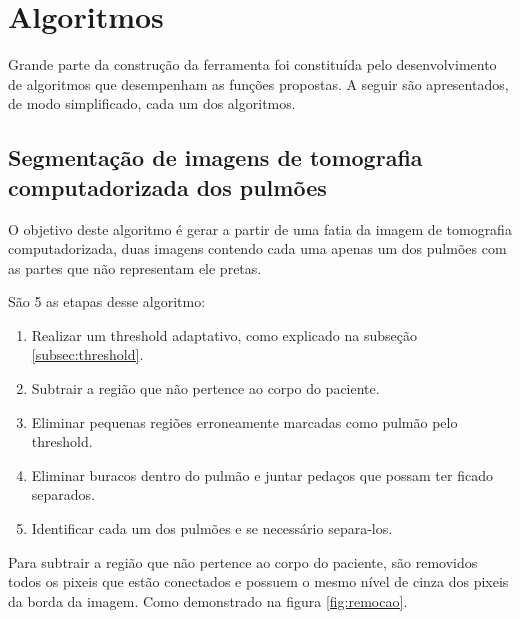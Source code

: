 \section{Algoritmos}

Grande   parte  da   construção    da  ferramenta    foi constituída pelo desenvolvimento de algoritmos que desempenham as funções propostas. A seguir são apresentados, de modo simplificado, cada um dos algoritmos.

\subsection{Segmentação de imagens de tomografia computadorizada dos pulmões}

O objetivo deste algoritmo é gerar a partir de uma fatia da imagem de tomografia computadorizada, duas imagens contendo cada uma apenas um dos pulmões com as partes que não representam ele pretas.


São 5 as etapas desse algoritmo:
\begin{enumerate}
 \item Realizar um threshold adaptativo, como explicado na subseção \ref{subsec:threshold}.
 \item Subtrair a região que não pertence ao corpo do paciente.
 \item Eliminar pequenas regiões erroneamente marcadas como pulmão pelo threshold.
 \item Eliminar buracos dentro do pulmão e juntar pedaços que possam ter ficado separados.
 \item Identificar cada um dos pulmões e se necessário separa-los.
\end{enumerate}

Para subtrair a região que não pertence ao corpo do paciente, são removidos todos os pixeis que estão conectados e possuem o mesmo nível de cinza dos pixeis da borda da imagem. Como demonstrado na figura \ref{fig:remocao}.


